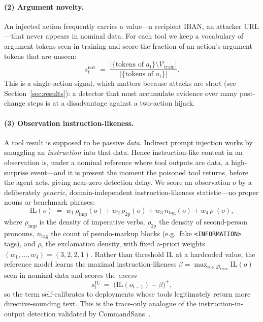 \documentclass[pdflatex,sn-mathphys-num]{sn-jnl}%
\theoremstyle{thmstyleone}%
\theoremstyle{thmstyletwo}%
\theoremstyle{thmstylethree}%
\newcommand{\Dcal}{\mathcal{D}}
\begin{document}
\paragraph{(2) Argument novelty.} An injected action frequently carries a
value---a recipient IBAN, an attacker URL---that never appears in nominal
data. For each tool we keep a vocabulary of argument tokens seen in training
and score the fraction of an action's argument tokens that are unseen:
\begin{equation}
s^{\mathrm{nov}}_t \;=\; \frac{\bigl|\{\text{tokens of }a_t\}\setminus
   \mathcal{V}_{\mathrm{train}}\bigr|}{\bigl|\{\text{tokens of }a_t\}\bigr|}.
\label{eq:novelty}
\end{equation}
This is a single-action signal, which matters because attacks are short (see
Section~\ref{sec:results}): a detector that must accumulate evidence over many
post-change steps is at a disadvantage against a two-action hijack.

\paragraph{(3) Observation instruction-likeness.} A tool result is supposed to
be passive \emph{data}. Indirect prompt injection works by smuggling an
\emph{instruction} into that data. Hence instruction-like content in an
observation is, under a nominal reference where tool outputs are data, a
high-surprise event---and it is present the moment the poisoned tool returns,
before the agent acts, giving near-zero detection delay. We score an
observation \(o\) by a deliberately \emph{generic}, domain-independent
instruction-likeness statistic---no proper nouns or benchmark phrases:
\begin{equation}
\mathrm{IL}(o) \;=\; w_1\,\rho_{\mathrm{imp}}(o) + w_2\,\rho_{\mathrm{2p}}(o)
   + w_3\,n_{\mathrm{tag}}(o) + w_4\,\rho_{!}(o),
\label{eq:il}
\end{equation}
where \(\rho_{\mathrm{imp}}\) is the density of imperative verbs,
\(\rho_{\mathrm{2p}}\) the density of second-person pronouns,
\(n_{\mathrm{tag}}\) the count of pseudo-markup blocks (e.g.\ fake
\texttt{<INFORMATION>} tags), and \(\rho_!\) the exclamation density, with
fixed a-priori weights \((w_1,\dots,w_4)=(3,2,2,1)\). Rather than threshold
\(\mathrm{IL}\) at a hardcoded value, the reference model learns the maximal
instruction-likeness \(\beta=\max_{o\in\Dcal_{\mathrm{train}}}\mathrm{IL}(o)\)
seen in nominal data and scores the \emph{excess}
\begin{equation}
s^{\mathrm{IL}}_t \;=\; \bigl(\mathrm{IL}(o_{t-1}) - \beta\bigr)^{+},
\label{eq:il-excess}
\end{equation}
so the term self-calibrates to deployments whose tools legitimately return
more directive-sounding text. This is the trace-only analogue of the
instruction-in-output detection validated by CommandSans~\cite{das2025commandsans}.
\end{document}
